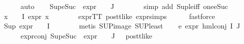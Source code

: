 \begin{isabellebody}
\ \ \ \ \isamarkupfalse%
\ auto\isanewline
\ \ \isamarkupfalse%
\ {\isachardoublequoteopen}Sup{\isacharparenleft}{\kern0pt}{\isacharparenleft}{\kern0pt}eSuc\ {\isasymcirc}\ expr{\isacharunderscore}{\kern0pt}{}\ {\isasymcirc}\ {\isasymPhi}{\isacharparenright}{\kern0pt}\ {\isacharbackquote}{\kern0pt}\ J{\isacharparenright}{\kern0pt}\ {\isasymle}\ {}{\isachardoublequoteclose}\isanewline
\ \ \ \ \isamarkupfalse%
\ {\isacharparenleft}{\kern0pt}simp\ add{\isacharcolon}{\kern0pt}\ Sup{\isacharunderscore}{\kern0pt}le{\isacharunderscore}{\kern0pt}iff\ one{\isacharunderscore}{\kern0pt}eSuc{\isacharparenright}{\kern0pt}\isanewline
\ \ \isamarkupfalse%
\ {\isachardoublequoteopen}{\isasymforall}x\ {\isasymin}\ {\isacharparenleft}{\kern0pt}{\isasymPhi}\ {\isacharbackquote}{\kern0pt}\ I{\isacharparenright}{\kern0pt}{\isachardot}{\kern0pt}\ expr{\isacharunderscore}{\kern0pt}{}\ x\ {\isasymle}\ {}{\isachardoublequoteclose}\isanewline
\ \ \ \ \isamarkupfalse%
\ expr{\isacharunderscore}{\kern0pt}TT\ pos{\isacharunderscore}{\kern0pt}tt{\isacharunderscore}{\kern0pt}like\ expr{\isachardot}{\kern0pt}simps\isanewline
\ \ \ \ \isamarkupfalse%
\ fastforce\isanewline
\ \ \isamarkupfalse%
\ {\isachardoublequoteopen}Sup\ {\isacharparenleft}{\kern0pt}{\isacharparenleft}{\kern0pt}expr{\isacharunderscore}{\kern0pt}{}\ {\isasymcirc}\ {\isasymPhi}{\isacharparenright}{\kern0pt}\ {\isacharbackquote}{\kern0pt}\ I{\isacharparenright}{\kern0pt}\ {\isasymle}\ {}{\isachardoublequoteclose}\isanewline
\ \ \ \ \isamarkupfalse%
\ {\isacharparenleft}{\kern0pt}metis\ SUP{\isacharunderscore}{\kern0pt}image\ SUP{\isacharunderscore}{\kern0pt}least{\isacharparenright}{\kern0pt}\isanewline
\ \ \isamarkupfalse%
\ e{}{\isacharcolon}{\kern0pt}\ {\isachardoublequoteopen}expr{\isacharunderscore}{\kern0pt}{}\ {\isacharparenleft}{\kern0pt}hml{\isacharunderscore}{\kern0pt}conj\ I\ J\ {\isasymPhi}{\isacharparenright}{\kern0pt}\ {\isasymle}\ {}{\isachardoublequoteclose}\isanewline
\ \ \ \ \isamarkupfalse%
\ expr{\isacharunderscore}{\kern0pt}{}{\isacharunderscore}{\kern0pt}conj\ {\isacartoucheopen}Sup{\isacharparenleft}{\kern0pt}{\isacharparenleft}{\kern0pt}eSuc\ {\isasymcirc}\ expr{\isacharunderscore}{\kern0pt}{}\ {\isasymcirc}\ {\isasymPhi}{\isacharparenright}{\kern0pt}\ {\isacharbackquote}{\kern0pt}\ J{\isacharparenright}{\kern0pt}\ {\isasymle}\ {}{\isacartoucheclose}\ pos{\isacharunderscore}{\kern0pt}tt{\isacharunderscore}{\kern0pt}like\ \isanewline

\end{isabellebody}
